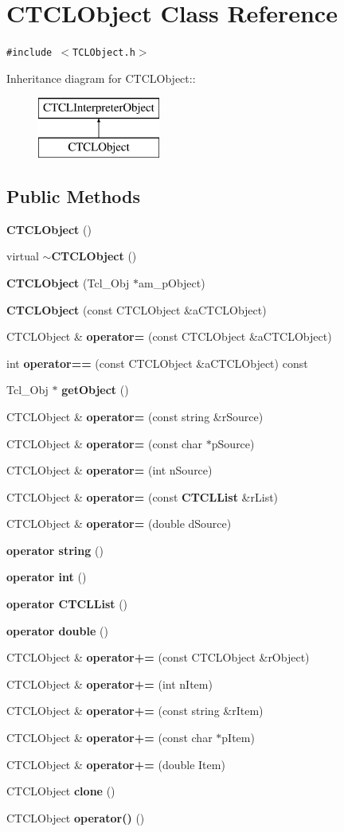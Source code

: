 \section{CTCLObject  Class Reference}
\label{classCTCLObject}
{\tt \#include $<$TCLObject.h$>$}

Inheritance diagram for CTCLObject::\begin{figure}[H]
\begin{center}
\leavevmode
\includegraphics[height=2cm]{classCTCLObject}
\end{center}
\end{figure}
\subsection*{Public Methods}
\begin{CompactItemize}
\item 
{\bf CTCLObject} ()
\item 
virtual {\bf $\sim$CTCLObject} ()
\item 
{\bf CTCLObject} (Tcl\_\-Obj $\ast$am\_\-p\-Object)
\item 
{\bf CTCLObject} (const CTCLObject \&a\-CTCLObject)
\item 
CTCLObject \& {\bf operator=} (const CTCLObject \&a\-CTCLObject)
\item 
int {\bf operator==} (const CTCLObject \&a\-CTCLObject) const
\item 
Tcl\_\-Obj $\ast$ {\bf get\-Object} ()
\item 
CTCLObject \& {\bf operator=} (const string \&r\-Source)
\item 
CTCLObject \& {\bf operator=} (const char $\ast$p\-Source)
\item 
CTCLObject \& {\bf operator=} (int n\-Source)
\item 
CTCLObject \& {\bf operator=} (const {\bf CTCLList} \&r\-List)
\item 
CTCLObject \& {\bf operator=} (double d\-Source)
\item 
{\bf operator string} ()
\item 
{\bf operator int} ()
\item 
{\bf operator CTCLList} ()
\item 
{\bf operator double} ()
\item 
CTCLObject \& {\bf operator+=} (const CTCLObject \&r\-Object)
\item 
CTCLObject \& {\bf operator+=} (int n\-Item)
\item 
CTCLObject \& {\bf operator+=} (const string \&r\-Item)
\item 
CTCLObject \& {\bf operator+=} (const char $\ast$p\-Item)
\item 
CTCLObject \& {\bf operator+=} (double Item)
\item 
CTCLObject {\bf clone} ()
\item 
CTCLObject {\bf operator()} ()
\end{CompactItemize}
